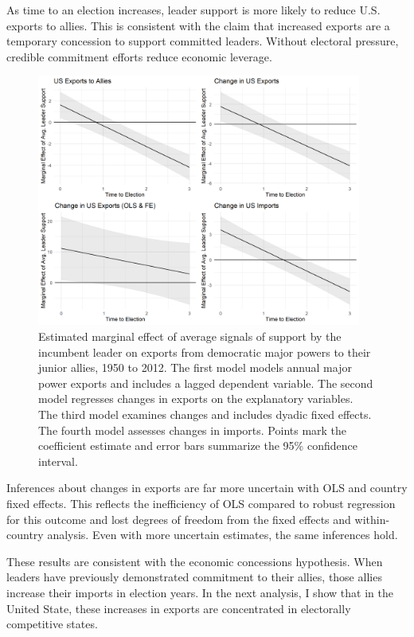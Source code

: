 \documentclass[12pt]{article}
\begin{document}
As time to an election increases, leader support is more likely to reduce U.S. exports to allies. 
This is consistent with the claim that increased exports are a temporary concession to support committed leaders.
Without electoral pressure, credible commitment efforts reduce economic leverage.


\begin{figure}[htpb]
	\centering
		\includegraphics[width=0.95\textwidth]{../figures/me-plots-us.png}
	\caption{Estimated marginal effect of average signals of support by the incumbent leader on exports from democratic major powers to their junior allies, 1950 to 2012. The first model models annual major power exports and includes a lagged dependent variable. The second model regresses changes in exports on the explanatory variables. The third model examines changes and includes dyadic fixed effects. The fourth model assesses changes in imports. Points mark the coefficient estimate and error bars summarize the 95\% confidence interval.}
	\label{fig:me-plots-us}
\end{figure}


Inferences about changes in exports are far more uncertain with OLS and country fixed effects. 
This reflects the inefficiency of OLS compared to robust regression for this outcome and lost degrees of freedom from the fixed effects and within-country analysis. 
Even with more uncertain estimates, the same inferences hold. 


These results are consistent with the economic concessions hypothesis. 
When leaders have previously demonstrated commitment to their allies, those allies increase their imports in election years.
In the next analysis, I show that in the United State, these increases in exports are concentrated in electorally competitive states.
\end{document}
